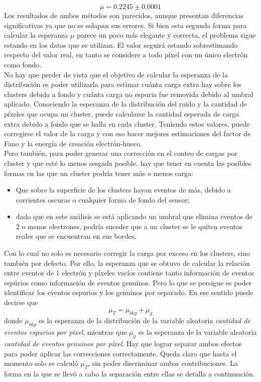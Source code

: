 \begin{equation*}
    \mu = 0.2245 \pm 0.0001
\end{equation*}
Los resultados de ambos métodos son parecidos, aunque presentan diferencias significativas ya que no se solapan sus errores. Si bien esta segunda forma para calcular la esperanza $\mu$ parece un poco más elegante y correcta, el problema sigue estando en los datos que se utilizan. El valor seguirá estando sobrestimando respecto del valor real, en tanto se considere a todo píxel con un único electrón como fondo.\\
\indent No hay que perder de vista que el objetivo de calcular la esperanza de la distribución es poder utilizarla para estimar cuánta carga extra hay sobre los clusters debida a fondo y cuánta carga no espuria fue removida debido al umbral aplicado. Conociendo la esperanza de la distribución del ruido y la cantidad de píxeles que ocupa un cluster, puede calcularse la cantidad esperada de carga extra debido a fondo que se halla en cada cluster. Teniendo estos valores, puede corregirse el valor de la carga y con eso hacer mejores estimaciones del factor de Fano y la energía de creación electrón-hueco.\\
\indent Pero también, para poder generar una corrección en el conteo de cargas por cluster y que esté lo menos sesgada posible, hay que tener en cuenta las posibles formas en las que un cluster podría tener más o menos carga:
\begin{itemize}
    \item Que sobre la superficie de los clusters hayan eventos de más, debido a corrientes oscuras o cualquier forma de fondo del sensor;
    \item dado que en este análisis se está aplicando un umbral que elimina eventos de $2$ o menos electrones, podría suceder que a un cluster se le quiten eventos reales que se encuentran en sus bordes.
\end{itemize}
Con lo cual no solo es necesario corregir la carga por exceso en los clusters, sino también por defecto. Por ello, la esperanza que se obtuvo de calcular la relación entre eventos de $1$ electrón y píxeles vacíos contiene tanto información de eventos espúrios como información de eventos genuinos. Pero lo que se persigue es poder identificar los eventos espurios y los genuinos por separado. En ese sentido puede decirse que 
\begin{equation*}
    \mu_{T} = \mu_{bkg} + \mu_{g}
\end{equation*}
donde $\mu_{bkg}$ es la esperanza de la distribución de la variable aleatoria \textit{cantidad de eventos espurios por píxel}, mientras que $\mu_{g}$ es la esperanza de la variable aleatoria \textit{cantidad de eventos genuinos por píxel}. Hay que lograr separar ambos efectos para poder aplicar las correcciones correctamente. Queda claro que hasta el momento solo se calculó $\mu_{T}$, sin poder discriminar ambas contribuciones. La forma en la que se llevó a cabo la separación entre ellas se detalla a continuación.


